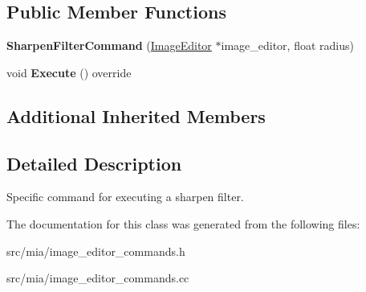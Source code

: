 \subsection*{Public Member Functions}
\begin{DoxyCompactItemize}
\item 
\mbox{\label{classimage__tools_1_1SharpenFilterCommand_a819182cc4a326e62c694a9e7741c9aea}} 
{\bfseries Sharpen\+Filter\+Command} (\hyperlink{classimage__tools_1_1ImageEditor}{Image\+Editor} $\ast$image\+\_\+editor, float radius)
\item 
\mbox{\label{classimage__tools_1_1SharpenFilterCommand_a31c1fd39c2495d2888b0644836666ced}} 
void {\bfseries Execute} () override
\end{DoxyCompactItemize}
\subsection*{Additional Inherited Members}


\subsection{Detailed Description}
Specific command for executing a sharpen filter. 

The documentation for this class was generated from the following files\+:\begin{DoxyCompactItemize}
\item 
src/mia/image\+\_\+editor\+\_\+commands.\+h\item 
src/mia/image\+\_\+editor\+\_\+commands.\+cc\end{DoxyCompactItemize}
